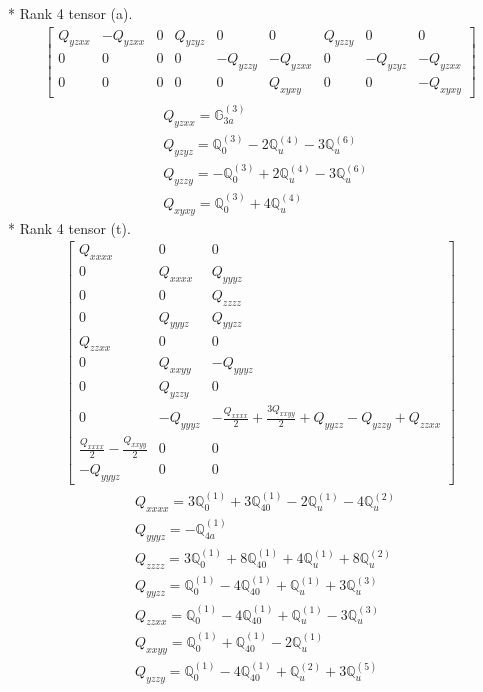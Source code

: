 \documentclass[fleqn,8pt,landscape]{jsarticle}
\begin{document}
* Rank 4 tensor (a).
\begin{align*}
\begin{bmatrix} Q_{yzxx} & - Q_{yzxx} & 0 & Q_{yzyz} & 0 & 0 & Q_{yzzy} & 0 & 0 \\ 0 & 0 & 0 & 0 & - Q_{yzzy} & - Q_{yzxx} & 0 & - Q_{yzyz} & - Q_{yzxx} \\ 0 & 0 & 0 & 0 & 0 & Q_{xyxy} & 0 & 0 & - Q_{xyxy} \end{bmatrix}
\end{align*}
\begin{align*}
& Q_{yzxx} = \mathbb{G}_{3a}^{(3)} \\
& Q_{yzyz} = \mathbb{Q}_{0}^{(3)} - 2 \mathbb{Q}_{u}^{(4)} - 3 \mathbb{Q}_{u}^{(6)} \\
& Q_{yzzy} = - \mathbb{Q}_{0}^{(3)} + 2 \mathbb{Q}_{u}^{(4)} - 3 \mathbb{Q}_{u}^{(6)} \\
& Q_{xyxy} = \mathbb{Q}_{0}^{(3)} + 4 \mathbb{Q}_{u}^{(4)}
\end{align*}
* Rank 4 tensor (t).
\begin{align*}
\begin{bmatrix} Q_{xxxx} & 0 & 0 \\ 0 & Q_{xxxx} & Q_{yyyz} \\ 0 & 0 & Q_{zzzz} \\ 0 & Q_{yyyz} & Q_{yyzz} \\ Q_{zzxx} & 0 & 0 \\ 0 & Q_{xxyy} & - Q_{yyyz} \\ 0 & Q_{yzzy} & 0 \\ 0 & - Q_{yyyz} & - \frac{Q_{xxxx}}{2} + \frac{3 Q_{xxyy}}{2} + Q_{yyzz} - Q_{yzzy} + Q_{zzxx} \\ \frac{Q_{xxxx}}{2} - \frac{Q_{xxyy}}{2} & 0 & 0 \\ - Q_{yyyz} & 0 & 0 \end{bmatrix}
\end{align*}
\begin{align*}
& Q_{xxxx} = 3 \mathbb{Q}_{0}^{(1)} + 3 \mathbb{Q}_{40}^{(1)} - 2 \mathbb{Q}_{u}^{(1)} - 4 \mathbb{Q}_{u}^{(2)} \\
& Q_{yyyz} = - \mathbb{Q}_{4a}^{(1)} \\
& Q_{zzzz} = 3 \mathbb{Q}_{0}^{(1)} + 8 \mathbb{Q}_{40}^{(1)} + 4 \mathbb{Q}_{u}^{(1)} + 8 \mathbb{Q}_{u}^{(2)} \\
& Q_{yyzz} = \mathbb{Q}_{0}^{(1)} - 4 \mathbb{Q}_{40}^{(1)} + \mathbb{Q}_{u}^{(1)} + 3 \mathbb{Q}_{u}^{(3)} \\
& Q_{zzxx} = \mathbb{Q}_{0}^{(1)} - 4 \mathbb{Q}_{40}^{(1)} + \mathbb{Q}_{u}^{(1)} - 3 \mathbb{Q}_{u}^{(3)} \\
& Q_{xxyy} = \mathbb{Q}_{0}^{(1)} + \mathbb{Q}_{40}^{(1)} - 2 \mathbb{Q}_{u}^{(1)} \\
& Q_{yzzy} = \mathbb{Q}_{0}^{(1)} - 4 \mathbb{Q}_{40}^{(1)} + \mathbb{Q}_{u}^{(2)} + 3 \mathbb{Q}_{u}^{(5)}
\end{align*}
\end{document}
